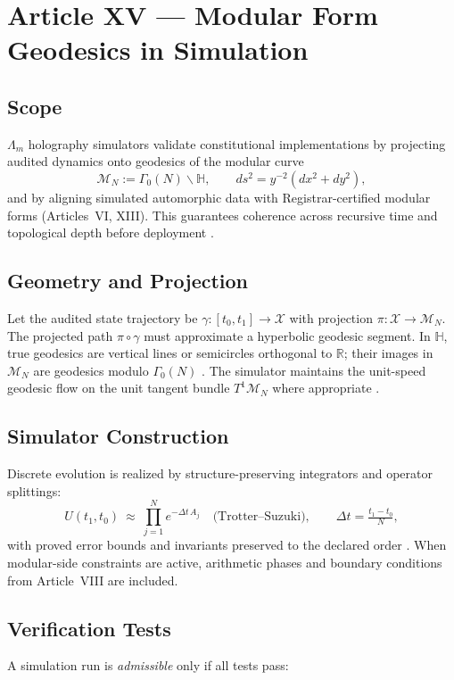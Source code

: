 \documentclass[12pt]{amsart}
\theoremstyle{plain}
\begin{document}
\section{Article XV — Modular Form Geodesics in Simulation}

\subsection{Scope}
$\Lambda_m$ holography simulators validate constitutional implementations by projecting audited dynamics onto geodesics of the modular curve
\[
\mathcal{M}_N := \Gamma_0(N)\backslash\mathbb{H},\qquad ds^2 = y^{-2}(dx^2+dy^2),
\]
and by aligning simulated automorphic data with Registrar-certified modular forms (Articles~VI, XIII). This guarantees coherence across recursive time and topological depth before deployment \cite{katok1992fuchsian,iwaniec2002spectral}.

\subsection{Geometry and Projection}
Let the audited state trajectory be $\gamma:[t_0,t_1]\to\mathcal{X}$ with projection $\pi:\mathcal{X}\to \mathcal{M}_N$. The projected path $\pi\circ\gamma$ must approximate a hyperbolic geodesic segment. In $\mathbb{H}$, true geodesics are vertical lines or semicircles orthogonal to $\mathbb{R}$; their images in $\mathcal{M}_N$ are geodesics modulo $\Gamma_0(N)$ \cite{katok1992fuchsian}. The simulator maintains the unit-speed geodesic flow on the unit tangent bundle $T^1\mathcal{M}_N$ where appropriate \cite{katok1992fuchsian}.

\subsection{Simulator Construction}
Discrete evolution is realized by structure-preserving integrators and operator splittings:
\[
U(t_1,t_0)\ \approx\ \prod_{j=1}^{N} e^{-\Delta t\,A_j}\quad\text{(Trotter–Suzuki)},\qquad \Delta t=\tfrac{t_1-t_0}{N},
\]
with proved error bounds and invariants preserved to the declared order \cite{trotter1959product,suzuki1976generalized,hairer2006geometric}. When modular-side constraints are active, arithmetic phases and boundary conditions from Article~VIII are included.

\subsection{Verification Tests}
A simulation run is \emph{admissible} only if all tests pass:
\end{document}
